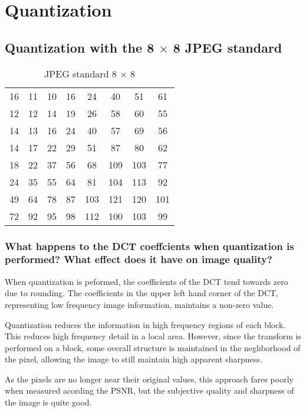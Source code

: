 \section{Quantization}

\subsection{Quantization with the 8 $\times$ 8 JPEG standard}

\begin{table}[tbhc]
	\caption{JPEG standard 8 $\times$ 8}
	\label{tbl:dctm}
	\begin{center}
		\begin{tabular}{ c c c c c c c c}
16 & 11 & 10 & 16 & 24 & 40 & 51 & 61 \\
12 & 12 & 14 & 19 & 26 & 58 & 60 & 55 \\
14 & 13 & 16 & 24 & 40 & 57 & 69 & 56 \\
14 & 17 & 22 & 29 & 51 & 87 & 80 & 62 \\
18 & 22 & 37 & 56 & 68 & 109 & 103 & 77 \\
24 & 35 & 55 & 64 & 81 & 104 & 113 & 92 \\
49 & 64 & 78 & 87 & 103 & 121 & 120 & 101 \\
72 & 92 & 95 & 98 & 112 & 100 & 103 & 99 \\
		\end{tabular}
	\end{center}
\end{table}



\subsubsection{What happens to the DCT coeffcients when quantization is performed? What effect does it have on image quality?}

When quantization is peformed, the coefficients of the DCT tend towards zero due to rounding. The coefficients in the upper left hand corner of the DCT, representing low frequency image information, maintains a non-zero value.

Quantization reduces the information in high frequency regions of each block. This reduces high frequency detail in a local area. However, since the transform is performed on a block, some overall structure is maintained in the neghborhood of the pixel, allowing the image to still maintain high apparent sharpness.

As the pixels are no longer near their original values, this approach fares poorly when measured acording the PSNR, but the subjective quality and sharpness of the image is quite good.

